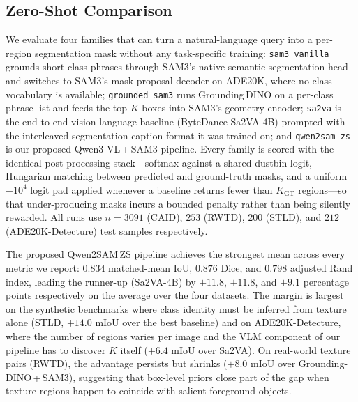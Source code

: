 %
%
\subsection{Zero-Shot Comparison}
\label{sec:zs_comparison}

We evaluate four families that can turn a natural-language query into a
per-region segmentation mask without any task-specific training:
\texttt{sam3\_vanilla} grounds short class phrases through SAM3's native
semantic-segmentation head and switches to SAM3's mask-proposal decoder on
ADE20K, where no class vocabulary is available;
\texttt{grounded\_sam3} runs Grounding\,DINO on a per-class phrase list
and feeds the top-$K$ boxes into SAM3's geometry encoder;
\texttt{sa2va} is the end-to-end vision-language baseline (ByteDance
Sa2VA-4B) prompted with the interleaved-segmentation caption format it was
trained on;
and \texttt{qwen2sam\_zs} is our proposed Qwen3-VL\,+\,SAM3 pipeline.
Every family is scored with the identical post-processing stack—softmax
against a shared dustbin logit, Hungarian matching between predicted and
ground-truth masks, and a uniform $-10^{4}$ logit pad applied whenever a
baseline returns fewer than $K_\text{GT}$ regions—so that under-producing
masks incurs a bounded penalty rather than being silently rewarded. All
runs use $n = 3091$ (CAID), $253$ (RWTD), $200$ (STLD), and $212$
(ADE20K-Detecture) test samples respectively.

The proposed Qwen2SAM\,ZS pipeline achieves the strongest mean across
every metric we report: $0.834$ matched-mean IoU, $0.876$ Dice, and
$0.798$ adjusted Rand index, leading the runner-up (Sa2VA-4B) by
$+11.8$, $+11.8$, and $+9.1$ percentage points respectively on the
average over the four datasets. The margin is largest on the synthetic
benchmarks where class identity must be inferred from texture alone
(STLD, $+14.0$ mIoU over the best baseline) and on ADE20K-Detecture,
where the number of regions varies per image and the VLM component of
our pipeline has to discover $K$ itself ($+6.4$ mIoU over Sa2VA). On
real-world texture pairs (RWTD), the advantage persists but shrinks
($+8.0$ mIoU over Grounding-DINO\,+\,SAM3), suggesting that box-level
priors close part of the gap when texture regions happen to coincide
with salient foreground objects.

